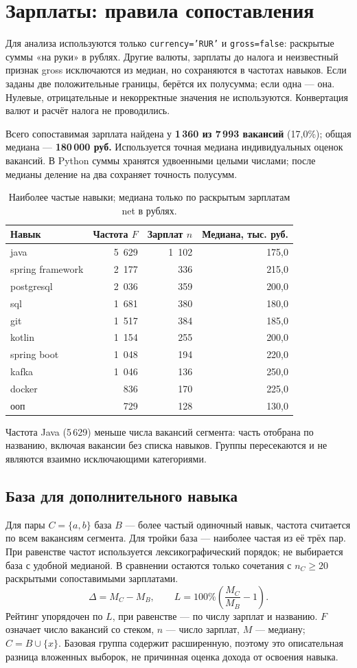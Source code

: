 \documentclass[11pt,a4paper]{article}
\begin{document}
\clearpage
\section{Зарплаты: правила сопоставления}
Для анализа используются только \texttt{currency='RUR'} и \texttt{gross=false}: раскрытые суммы «на руки» в рублях. Другие валюты, зарплаты до налога и неизвестный признак gross исключаются из медиан, но сохраняются в частотах навыков. Если заданы две положительные границы, берётся их полусумма; если одна --- она. Нулевые, отрицательные и некорректные значения не используются. Конвертация валют и расчёт налога не проводились.

Всего сопоставимая зарплата найдена у \textbf{1\,360 из 7\,993 вакансий} (17,0\%); общая медиана --- \textbf{180\,000 руб.} Используется точная медиана индивидуальных оценок вакансий. В Python суммы хранятся удвоенными целыми числами; после медианы деление на два сохраняет точность полусумм.
\begin{table}[h!]
\centering\small
\caption{Наиболее частые навыки; медиана только по раскрытым зарплатам net в рублях.}
\begin{tabularx}{\linewidth}{Xrrr}\toprule
Навык & Частота $F$ & Зарплат $n$ & Медиана, тыс. руб.\\\midrule
java & 5~629 & 1~102 & 175,0\\
spring framework & 2~177 & 336 & 215,0\\
postgresql & 2~036 & 359 & 200,0\\
sql & 1~681 & 380 & 180,0\\
git & 1~517 & 384 & 185,0\\
kotlin & 1~154 & 255 & 200,0\\
spring boot & 1~048 & 194 & 220,0\\
kafka & 1~046 & 136 & 250,0\\
docker & 836 & 170 & 225,0\\
ооп & 729 & 128 & 130,0\\
\bottomrule\end{tabularx}
\end{table}

Частота Java (5\,629) меньше числа вакансий сегмента: часть отобрана по названию, включая вакансии без списка навыков. Группы пересекаются и не являются взаимно исключающими категориями.

\subsection{База для дополнительного навыка}
Для пары $C=\{a,b\}$ база $B$ --- более частый одиночный навык, частота считается по всем вакансиям сегмента. Для тройки база --- наиболее частая из её трёх пар. При равенстве частот используется лексикографический порядок; не выбирается база с удобной медианой. В сравнении остаются только сочетания с $n_C\ge20$ раскрытыми сопоставимыми зарплатами.
\[
\Delta=M_C-M_B,\qquad
L=100\%\left(\frac{M_C}{M_B}-1\right).
\]
Рейтинг упорядочен по $L$, при равенстве --- по числу зарплат и названию. $F$ означает число вакансий со стеком, $n$ --- число зарплат, $M$ --- медиану; $C=B\cup\{x\}$. Базовая группа содержит расширенную, поэтому это описательная разница вложенных выборок, не причинная оценка дохода от освоения навыка.
\end{document}
